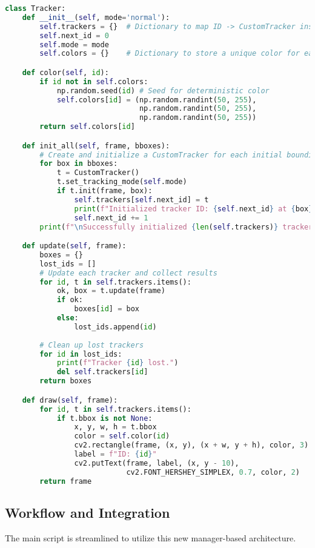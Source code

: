\documentclass[12pt, a4paper]{article}
\begin{document}
\begin{lstlisting}[language=Python, caption={The Tracker manager class for handling multiple objects.}, label={lst:manager_class}]
class Tracker:
    def __init__(self, mode='normal'):
        self.trackers = {}  # Dictionary to map ID -> CustomTracker instance
        self.next_id = 0
        self.mode = mode
        self.colors = {}    # Dictionary to store a unique color for each ID

    def color(self, id):
        if id not in self.colors:
            np.random.seed(id) # Seed for deterministic color
            self.colors[id] = (np.random.randint(50, 255), 
                               np.random.randint(50, 255), 
                               np.random.randint(50, 255))
        return self.colors[id]

    def init_all(self, frame, bboxes):
        # Create and initialize a CustomTracker for each initial bounding box
        for box in bboxes:
            t = CustomTracker()
            t.set_tracking_mode(self.mode)
            if t.init(frame, box):
                self.trackers[self.next_id] = t
                print(f"Initialized tracker ID: {self.next_id} at {box}")
                self.next_id += 1
        print(f"\nSuccessfully initialized {len(self.trackers)} trackers.")

    def update(self, frame):
        boxes = {}
        lost_ids = []
        # Update each tracker and collect results
        for id, t in self.trackers.items():
            ok, box = t.update(frame)
            if ok:
                boxes[id] = box
            else:
                lost_ids.append(id)
        
        # Clean up lost trackers
        for id in lost_ids:
            print(f"Tracker {id} lost.")
            del self.trackers[id]
        return boxes

    def draw(self, frame):
        for id, t in self.trackers.items():
            if t.bbox is not None:
                x, y, w, h = t.bbox
                color = self.color(id)
                cv2.rectangle(frame, (x, y), (x + w, y + h), color, 3)
                label = f"ID: {id}"
                cv2.putText(frame, label, (x, y - 10),
                            cv2.FONT_HERSHEY_SIMPLEX, 0.7, color, 2)
        return frame
\end{lstlisting}

\subsection{Workflow and Integration}
The main script is streamlined to utilize this new manager-based architecture.
\end{document}

